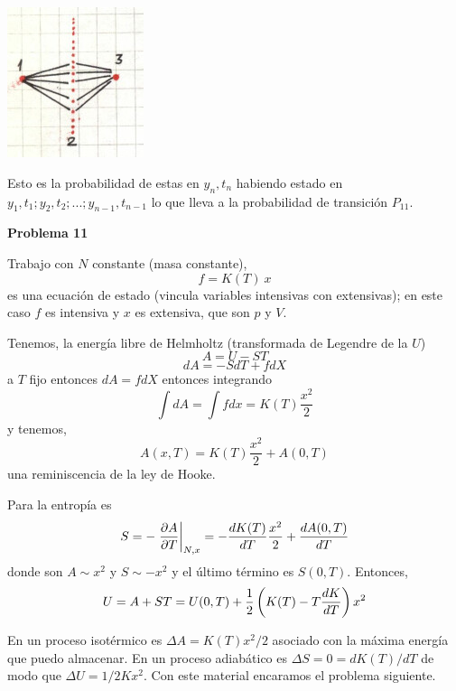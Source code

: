 \documentclass[10pt,oneside]{CBFT_book}
\begin{document}
\includegraphics[width=0.30\textwidth]{images/1606329125.jpg}

Esto es la probabilidad de estas en $y_n,t_n$ habiendo estado en $y_1,t_1;y_2,t_2;...;y_{n-1},t_{n-1}$
lo que lleva a la probabilidad de transición $P_{11}$.


\begin{ejemplo}{\bf Problema 11}

Trabajo con $N$ constante (masa constante),
\[
	f = K(T) \: x
\]
es una ecuación de estado (vincula variables intensivas con extensivas); en este caso $f$ es intensiva
y $x$ es extensiva, que son $p$ y $V$.

Tenemos, la energía libre de Helmholtz (transformada de Legendre de la $U$)
\[
	A = U -S T
\]
\[
	dA = - S dT + f dX
\]
a $T$ fijo entonces $dA = f dX$ entonces integrando
\[
	\int dA = \int f dx = K(T) \frac{x^2}{2}
\]
y tenemos,
\[
	A(x,T) = K(T) \frac{x^2}{2} + A(0,T)
\]
una reminiscencia de la ley de Hooke.

Para la entropía es 
\[
	S = - \left.\frac{\partial^{\hspace{-0.05em}} {A}}{\partial {T}^{\hspace{-0.05em}}}\right|_{N,x} = - \frac{d^{\hspace{-0.05em}} {K(T)}}{d {T}^{\hspace{-0.05em}}} \frac{x^2}{2} + \frac{d^{\hspace{-0.05em}} {A(0,T)}}{d {T}^{\hspace{-0.05em}}}
\]
donde son $A \sim x^2$ y $S \sim -x^2$ y el último término es $S(0,T)$.
Entonces,
\[
	U = A + S T = U(0,T) + \frac{1}{2}\left( K(T) - T \frac{d^{\hspace{-0.05em}} {K}}{d {T}^{\hspace{-0.05em}}} \right) x^2
\]

En un proceso isotérmico es $\Delta A = K(T) x^2/2$ asociado con la máxima energía que  puedo
almacenar.
En un proceso adiabático es $\Delta S = 0 = dK(T)/dT$ de modo que $\Delta U = 1/2 K x^2$.
Con este material encaramos el problema siguiente.
 
\end{ejemplo}
\end{document}
